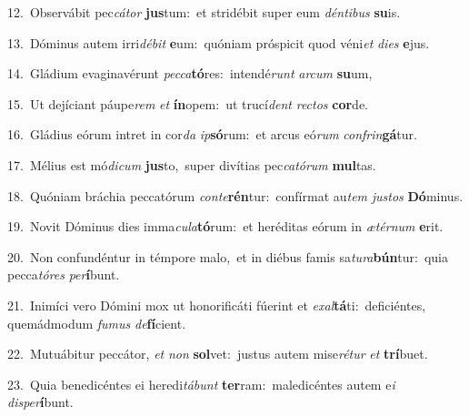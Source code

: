 {\numbfont\textcolor{\numbcolor}{12.}}~Observábit pec\-\textit{cá}\-\textit{tor} \textbf{jus}\-tum:~\star et stridébit super eum \textit{dén}\-\textit{ti}\textit{bus} \textbf{su}\-is.\par
{\numbfont\textcolor{\numbcolor}{13.}}~Dóminus autem irri\-\textit{dé}\-\textit{bit} \textbf{e}\-um:~\star quóniam próspicit quod véni\textit{et} \textit{di}\-\textit{es} \textbf{e}\-jus.\par
{\numbfont\textcolor{\numbcolor}{14.}}~Gládium evaginavérunt \textit{pec}\-\textit{ca}\textbf{tó}res:~\star intendé\textit{runt} \textit{ar}\-\textit{cum} \textbf{su}\-um,\par
{\numbfont\textcolor{\numbcolor}{15.}}~Ut dejíciant páupe\textit{rem} \textit{et} \textbf{ín}\-opem:~\star ut trucí\textit{dent} \textit{rec}\-\textit{tos} \textbf{cor}\-de.\par
{\numbfont\textcolor{\numbcolor}{16.}}~Gládius eórum intret in cor\textit{da} \textit{ip}\-\textbf{só}rum:~\star et arcus eó\textit{rum} \textit{con}\-\textit{frin}\textbf{gá}tur.\par
{\numbfont\textcolor{\numbcolor}{17.}}~Mélius est mó\-\textit{di}\-\textit{cum} \textbf{jus}\-to,~\star super divítias pec\-\textit{ca}\-\textit{tó}\textit{rum} \textbf{mul}\-tas.\par
{\numbfont\textcolor{\numbcolor}{18.}}~Quóniam bráchia peccatórum \textit{con}\-\textit{te}\textbf{rén}tur:~\star confírmat au\textit{tem} \textit{jus}\-\textit{tos} \textbf{Dó}\-minus.\par
{\numbfont\textcolor{\numbcolor}{19.}}~Novit Dóminus dies imma\-\textit{cu}\-\textit{la}\textbf{tó}rum:~\star et heréditas eórum in \textit{æ}\-\textit{tér}\textit{num} \textbf{e}\-rit.\par
{\numbfont\textcolor{\numbcolor}{20.}}~Non confundéntur in témpore malo,~\dagger et in diébus famis sa\-\textit{tu}\-\textit{ra}\textbf{bún}tur:~\star quia pecca\-\textit{tó}\-\textit{res} \textit{per}\-\textbf{í}bunt.\par
{\numbfont\textcolor{\numbcolor}{21.}}~Inimíci vero Dómini mox ut honorificáti fúerint et \textit{ex}\-\textit{al}\textbf{tá}ti:~\star deficiéntes, quemádmodum \textit{fu}\-\textit{mus} \textit{de}\-\textbf{fí}cient.\par
{\numbfont\textcolor{\numbcolor}{22.}}~Mutuábitur peccátor, \textit{et} \textit{non} \textbf{sol}\-vet:~\star justus autem mise\-\textit{ré}\-\textit{tur} \textit{et} \textbf{trí}\-buet.\par
{\numbfont\textcolor{\numbcolor}{23.}}~Quia benedicéntes ei heredi\-\textit{tá}\-\textit{bunt} \textbf{ter}\-ram:~\star maledicéntes autem e\textit{i} \textit{dis}\-\textit{per}\textbf{í}bunt.\par
